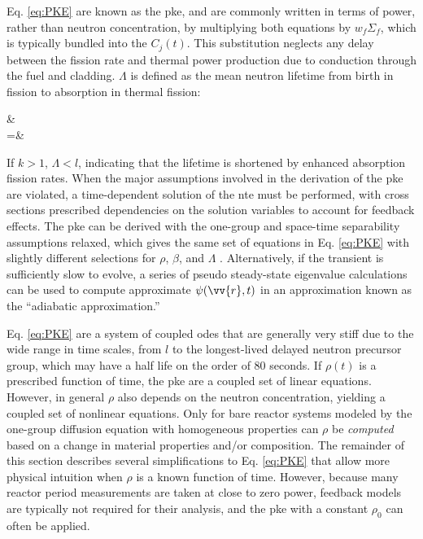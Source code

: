 Eq. \eqref{eq:PKE} are known as the \gls{pke}, and are commonly written in terms of power, rather than neutron concentration, by multiplying both equations by \(w_f\Sigma_f\), which is typically bundled into the \(C_j(t)\). This substitution neglects any delay between the fission rate and thermal power production due to conduction through the fuel and cladding. \(\Lambda\) is defined as the mean neutron lifetime from birth in fission to absorption in thermal fission:

\beqa
\label{eq:LambdaDef}
\Lambda\equiv&\\
=&
\eeqa

If \(k>1\), \(\Lambda<l\), indicating that the lifetime is shortened by enhanced absorption fission rates. When the major assumptions involved in the derivation of the \gls{pke} are violated, a time-dependent solution of the \gls{nte} must be performed, with cross sections prescribed dependencies on the solution variables to account for feedback effects. The \gls{pke} can be derived with the one-group and space-time separability assumptions relaxed, which gives the same set of equations in Eq. \eqref{eq:PKE} with slightly different selections for \(\rho\), \(\beta\), and \(\Lambda\) \cite{duderstadt}. Alternatively, if the transient is sufficiently slow to evolve, a series of pseudo steady-state eigenvalue calculations can be used to compute approximate \(\psi(\vv{r},t)\) in an approximation known as the ``adiabatic approximation.''

Eq. \eqref{eq:PKE} are a system of coupled \glspl{ode} that are generally very stiff due to the wide range in time scales, from \(l\) to the longest-lived delayed neutron precursor group, which may have a half life on the order of 80 seconds. If \(\rho(t)\) is a prescribed function of time, the \gls{pke} are a coupled set of linear equations. However, in general \(\rho\) also depends on the neutron concentration, yielding a coupled set of nonlinear equations. Only for bare reactor systems modeled by the one-group diffusion equation with homogeneous properties can \(\rho\) be {\it computed} based on a change in material properties and/or composition. The remainder of this section describes several simplifications to Eq. \eqref{eq:PKE} that allow more physical intuition when \(\rho\) is a known function of time. However, because many reactor period measurements are taken at close to zero power, feedback models are typically not required for their analysis, and the \gls{pke} with a constant \(\rho_0\) can often be applied.

